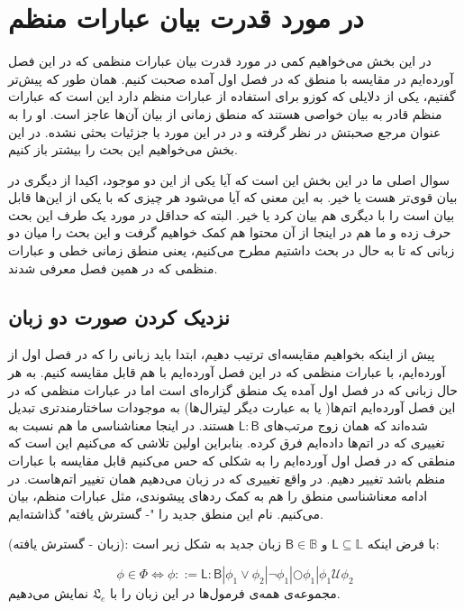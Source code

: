 \section{در مورد قدرت بیان عبارات منظم}
در این بخش می‌‌خواهیم کمی در مورد قدرت بیان عبارات منظمی که در این فصل آورده‌ایم در مقایسه با منطق  که در فصل اول آمده صحبت کنیم. همان طور که پیش‌تر گفتیم، یکی از دلایلی که کوزو برای استفاده از عبارات منظم دارد این است که عبارات منظم قادر به بیان خواصی هستند که منطق زمانی از بیان آن‌ها عاجز است. او \cite{regisbetter} را به عنوان مرجع صحبتش در نظر گرفته و در \cite{calcul} در این مورد با جزئیات بحثی نشده. 
در این بخش می‌خواهیم این بحث را بیشتر باز کنیم. 

سوال اصلی ما در این بخش این است که آیا یکی از این دو موجود، اکیدا از دیگری در بیان قوی‌تر هست یا خیر. به این معنی که آیا می‌شود هر چیزی که با یکی از این‌ها قابل بیان است را با دیگری هم بیان کرد یا خیر. البته که \cite{regisbetter} حداقل در مورد یک طرف این بحث حرف زده و ما هم در اینجا از آن محتوا هم کمک خواهیم گرفت و این بحث را میان دو زبانی که تا به حال در بحث داشتیم مطرح می‌کنیم، یعنی منطق زمانی خطی و عبارات منظمی که در همین فصل معرفی شدند.

\subsection{نزدیک کردن صورت دو زبان}

پیش از اینکه بخواهیم مقایسه‌ای ترتیب دهیم، ابتدا باید زبانی را که در فصل اول از  آورده‌ایم، با عبارات منظمی که در این فصل آورده‌ایم با هم قابل مقایسه کنیم. به هر حال زبانی که در فصل اول آمده یک منطق گزاره‌ای است اما در عبارات منظمی که در این فصل آورده‌ایم اتم‌ها( یا به عبارت دیگر لیترال‌ها) به موجودات ساختارمندتری تبدیل شده‌اند که همان زوج مرتب‌های $\mathsf{L:B}$ هستند. در اینجا معناشناسی ما هم نسبت به تغییری که در اتم‌ها داده‌ایم فرق کرده. بنابراین اولین تلاشی که می‌کنیم این است که منطقی که در فصل اول آورده‌ایم را به شکلی که حس می‌کنیم قابل مقایسه با عبارات منظم باشد تغییر دهیم. در واقع تغییری که در زبان می‌دهیم همان تغییر اتم‌هاست. در ادامه معناشناسی منطق  را هم به کمک ردهای پیشوندی، مثل عبارات منظم، بیان می‌کنیم. نام این منطق جدید را "- گسترش یافته" گذاشته‌ایم. 

\begin{defn}
	(زبان - گسترش‌ یافته): با فرض اینکه 
	$\mathsf{L} \subseteq \mathbb{L}$
	و 
	$\mathsf{B} \in \mathbb{B}$
	زبان جدید   به شکل زیر است:
	
	$$
	\phi \in \Phi \Leftrightarrow
	\phi ::= \mathsf{L:B} | \phi_1 \lor \phi_2 |
	\neg \phi_1 |
	\bigcirc \phi_1 |
	\phi_1 \mathcal{U}\phi_2 
	$$	
	مجموعه‌ی همه‌ی فرمول‌ها در این زبان را با $\mathfrak{L}_e$ نمایش می‌دهیم.
\end{defn} 

